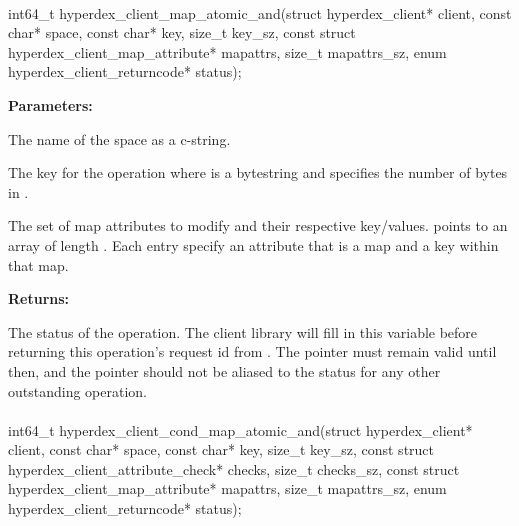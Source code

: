 \paragraph{}
\begin{ccode}
int64_t hyperdex_client_map_atomic_and(struct hyperdex_client* client,
                const char* space,
                const char* key, size_t key_sz,
                const struct hyperdex_client_map_attribute* mapattrs, size_t mapattrs_sz,
                enum hyperdex_client_returncode* status);
\end{ccode}
\funcdesc 

\noindent\textbf{Parameters:}
\begin{description}[labelindent=\widthof{{\code{mapattrs}, \code{mapattrs\_sz}}},leftmargin=*,noitemsep,nolistsep,align=right]
\item[\code{space}] The name of the space as a c-string.
\item[\code{key}, \code{key\_sz}] The key for the operation where  is a bytestring and  specifies the number of bytes in .
\item[\code{mapattrs}, \code{mapattrs\_sz}] The set of map attributes to modify and their respective key/values.   points to an array of length .  Each entry specify an attribute that is a map and a key within that map.
\end{description}

\noindent\textbf{Returns:}
\begin{description}[labelindent=\widthof{{\code{status}}},leftmargin=*,noitemsep,nolistsep,align=right]
\item[\code{status}] The status of the operation.  The client library will fill in this variable before returning this operation's request id from .  The pointer must remain valid until then, and the pointer should not be aliased to the status for any other outstanding operation.
\end{description}

\paragraph{}
\begin{ccode}
int64_t hyperdex_client_cond_map_atomic_and(struct hyperdex_client* client,
                const char* space,
                const char* key, size_t key_sz,
                const struct hyperdex_client_attribute_check* checks, size_t checks_sz,
                const struct hyperdex_client_map_attribute* mapattrs, size_t mapattrs_sz,
                enum hyperdex_client_returncode* status);
\end{ccode}
\funcdesc 

